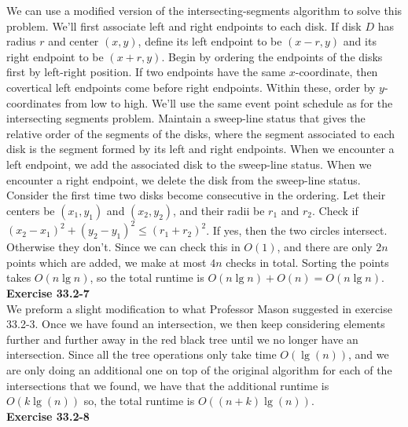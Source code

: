 \documentclass{article}
\begin{document}
We can use a modified version of the intersecting-segments algorithm to solve this problem.  We'll first associate left and right endpoints to each disk.  If disk $D$ has radius $r$ and center $(x,y)$, define its left endpoint to be $(x-r,y)$ and its right endpoint to be $(x+r,y)$.  Begin by ordering the endpoints of the disks first by left-right position.  If two endpoints have the same $x$-coordinate, then covertical left endpoints come before right endpoints.  Within these, order by $y$-coordinates from low to high. We'll use the same event point schedule as for the intersecting segments problem.  Maintain a sweep-line status that gives the relative order of the segments of the disks, where the segment associated to each disk is the segment formed by its left and right endpoints.  When we encounter a left endpoint, we add the associated disk to the sweep-line status.  When we encounter a right endpoint, we delete the disk from the sweep-line status.  Consider the first time two disks become consecutive in the ordering.  Let their centers be $(x_1,y_1)$ and $(x_2,y_2)$, and their radii be $r_1$ and $r_2$.  Check if $(x_2-x_1)^2 + (y_2-y_1)^2 \leq (r_1+r_2)^2$.  If yes, then the two circles intersect.  Otherwise they don't.  Since we can check this in $O(1)$, and there are only $2n$ points which are added, we make at most $4n$ checks in total.  Sorting the points takes $O(n\lg n)$, so the total runtime is $O(n\lg n) + O(n) = O(n\lg n)$. \\

\noindent\textbf{Exercise 33.2-7}\\

We preform a slight modification to what Professor Mason suggested in exercise 33.2-3. Once we have found an intersection, we then keep considering elements further and further away in the red black tree until we no longer have an intersection. Since all the tree operations only take time $O(\lg(n))$, and we are only doing an additional one on top of the original algorithm for each of the intersections that we found, we have that the additional runtime is $O(k\lg(n))$ so, the total runtime is $O((n+k)\lg(n))$.\\




\noindent\textbf{Exercise 33.2-8}\\
\end{document}
